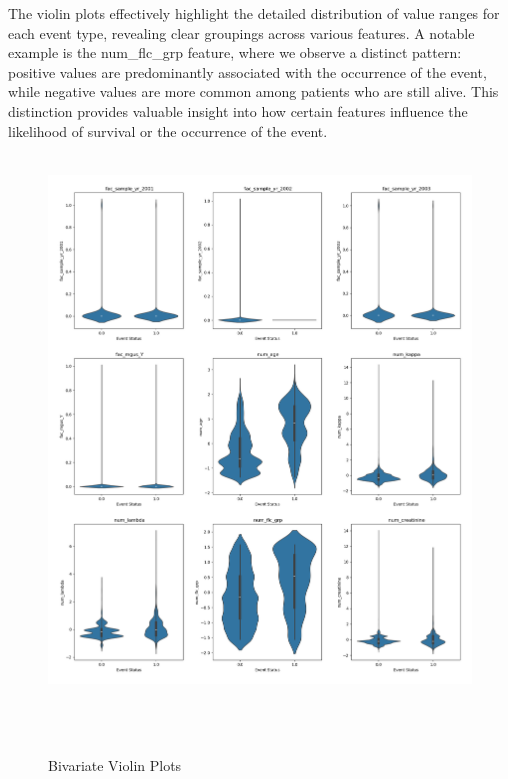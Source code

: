 \clearpage
\noindent The violin plots effectively highlight the detailed distribution of value ranges for each event type, revealing clear groupings across various features. A notable example is the num\_flc\_grp feature, where we observe a distinct pattern: positive values are predominantly associated with the occurrence of the event, while negative values are more common among patients who are still alive. This distinction provides valuable insight into how certain features influence the likelihood of survival or the occurrence of the event.
\begin{figure}[h]
    \centering
    \includegraphics[scale=0.33]{Figures/EDA/violin3.png}
    \caption{Bivariate Violin Plots}
    \label{fig:your_label}
\end{figure}



